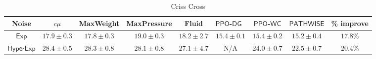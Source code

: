 \begin{table}[h!]
\centering \caption{Criss Cross}
\vspace{1em}
\label{table:criss-cross} %
\begin{tabular}{ccccccccc}
\toprule 
{\footnotesize{}Noise } & {\footnotesize{}$c\mu$ } & {\footnotesize{}MaxWeight } & {\footnotesize{}MaxPressure} & {\footnotesize{}Fluid } & {\footnotesize{}$\mathsf{PPO}$-$\mathsf{DG}$~\cite{dai2022queueing}} & {\footnotesize{}$\mathsf{PPO}$-$\mathsf{WC}$} & {\footnotesize{}$\mathsf{PATHWISE}$} &
{\footnotesize{}\% improve}\tabularnewline
\midrule 
{\footnotesize{}$\mathsf{Exp}$ } & {\footnotesize{}$17.9\pm0.3$ } & {\footnotesize{}$17.8\pm0.3$ } & {\footnotesize{}$19.0\pm0.3$ } & {\footnotesize{}$18.2\pm2.7$} & {\footnotesize{}$\mathbf{15.4\pm0.1}$ } & {\footnotesize{}$\mathbf{15.4\pm0.2}$ } & {\footnotesize{}$\mathbf{15.2\pm0.4}$} &
{\footnotesize{}$17.8\%$}
\tabularnewline
\midrule 
{\footnotesize{}$\mathsf{HyperExp}$} & {\footnotesize{}$28.4\pm0.5$ } & {\footnotesize{}$28.3\pm0.8$ } & {\footnotesize{}$28.1\pm0.8$ } &
{\footnotesize{}$27.1\pm4.7$ }& {\footnotesize{}N/A} & 
{\footnotesize{}$24.0\pm0.7$ } & 
{\footnotesize{}$\mathbf{22.5\pm0.7}$ } &
{\footnotesize{}$20.4\%$}
\tabularnewline
\bottomrule
\end{tabular}
\end{table}


